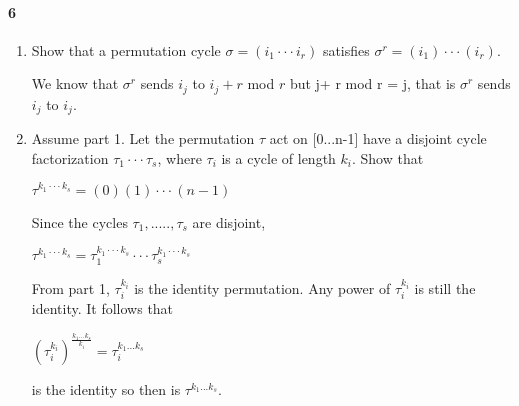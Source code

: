 \documentclass[10 pt]{article}
\begin{document}
\paragraph{6}
\begin{enumerate}
\item Show that a permutation cycle $\sigma = (i_1 \cdot \cdot \cdot i_r)$ satisfies $ \sigma^r = (i_1) \cdot \cdot \cdot (i_r)$. 

We know that $\sigma^r$ sends $i_j$ to $i_j+r$ mod $r$ but j+ r mod r = j, that is $\sigma^r$ sends $i_j$ to $ i_j$.

\item Assume part 1. Let the permutation $\tau$ act on [0...n-1] have a disjoint cycle factorization $\tau_1 \cdot \cdot \cdot \tau_s$, where $\tau_i$ is a cycle of length $k_i$. Show that 

$\tau^{k_1 \cdot \cdot \cdot k_s} = (0)(1) \cdot \cdot \cdot (n-1)$

Since the cycles $\tau_1,....., \tau_s$ are disjoint,

$\tau^{k_1 \cdot \cdot \cdot k_s} = \tau_1^{k_1 \cdot \cdot \cdot k_s} \cdot \cdot \cdot \tau_s^{k_1 \cdot \cdot \cdot k_s}$

From part 1, $\tau_i^{k_i}$ is the identity permutation. Any power of $\tau_i^{k_i}$ is still the identity. It follows that 

$(\tau_i^{k_i})^{\frac{k_1...k_s}{k_i}} = \tau_i^{k_1...k_s}$

is the identity so then is $\tau^{k_1...k_s}$. 

\end{enumerate}
\end{document}
